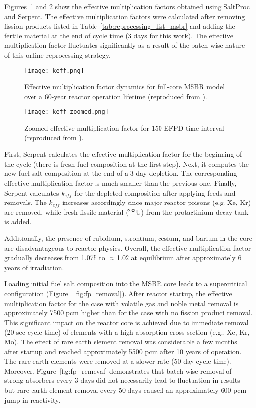 Figures~\ref{fig:keff} and \ref{fig:keff_zoomed} show the effective 
multiplication factors obtained using SaltProc and Serpent. The effective 
multiplication factors were calculated after removing fission products listed 
in Table~\ref{tab:reprocessing_list_msbr} and adding the fertile material at 
the end of cycle time (3 days for this work). The effective multiplication 
factor fluctuates significantly as a result of the batch-wise nature of this 
online reprocessing strategy. 
\begin{figure}[ht!] 
	\centering
	\texttt{[image: keff.png]}
	\caption{Effective multiplication factor dynamics for full-core \gls{MSBR} 
		model over a 60-year reactor operation lifetime (reproduced from 
		\cite{rykhlevskii_modeling_2019}).}
	\label{fig:keff}
\end{figure}
\begin{figure}[ht!] 
	\centering
	\texttt{[image: keff\_zoomed.png]}
	\caption{Zoomed effective multiplication factor for 150-EFPD time interval 
		(reproduced from \cite{rykhlevskii_modeling_2019}).}
	\label{fig:keff_zoomed}
\end{figure}

First, Serpent calculates the effective multiplication factor for the 
beginning of the cycle (there is fresh fuel composition at the first step). 
Next, it computes the new fuel salt composition at the end of a 3-day 
depletion. The corresponding effective multiplication factor is much smaller 
than the previous one. Finally, Serpent calculates $k_{eff}$ for the depleted 
composition after applying feeds and removals. The $k_{eff}$ increases 
accordingly since major reactor poisons (e.g. Xe, Kr) are removed, while fresh 
fissile material ($^{233}$U) from the protactinium decay tank is added.  

Additionally, the presence of rubidium, strontium, cesium, and barium in the 
core are disadvantageous to reactor physics. 
Overall, the effective multiplication factor gradually decreases from 1.075 to 
$\approx$1.02 at equilibrium after approximately 6 years of irradiation. 

Loading initial fuel salt composition into the \gls{MSBR} core leads to a 
supercritical configuration (Figure ~\ref{fig:fp_removal}). After reactor 
startup, the effective multiplication factor for the case with volatile gas 
and noble metal removal is approximately 7500 pcm  higher than for the case 
with no fission product removal. This significant impact on the reactor core is
achieved due to immediate removal (20 sec cycle time) of elements with a high 
absorption cross section (e.g., Xe, Kr, Mo). The effect of rare earth 
element removal was considerable a few months after startup and reached 
approximately 5500 pcm after 10 years of operation. The rare earth elements 
were removed at a slower rate (50-day cycle time). Moreover, 
Figure~\ref{fig:fp_removal} demonstrates that batch-wise removal of strong 
absorbers every 3 days did not necessarily lead to fluctuation in results 
but rare earth element removal every 50 days caused an approximately 600 pcm 
jump in reactivity.

